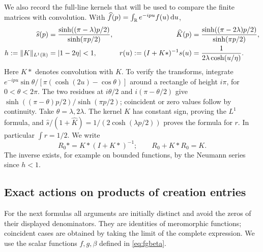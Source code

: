 We also record the full-line kernels that will be used to compare the
finite matrices with convolution.  With
$\widehat f(p)=\int_{\mathbb R}e^{-ipu}f(u)\,\mathrm d u$,
\begin{align}
 \widehat s(p)&=\frac{\sinh((\pi-\lambda)p/2)}{\sinh(\pi p/2)},&
 \widehat K(p)&=\frac{\sinh((\pi-2\lambda)p/2)}{\sinh(\pi p/2)},
 \label{eq:kernel-transforms}\\
 h:=\|K\|_{L^1(\mathbb R)}&=|1-2\eta|<1,&
 r(u):=(I+K*)^{-1}s(u)&=\frac1{2\lambda\cosh(u/\eta)}.
 \label{eq:dressed-density}
\end{align}
Here $K*$ denotes convolution with $K$.  To verify the transforms,
integrate $e^{-ipu}\sin\theta/[\pi(\cosh(2u)-\cos\theta)]$ around a
rectangle of height $i\pi$, for $0<\theta<2\pi$.  The two residues at
$i\theta/2$ and $i(\pi-\theta/2)$ give
$\sinh((\pi-\theta)p/2)/\sinh(\pi p/2)$; coincident or zero values
follow by continuity.  Take $\theta=\lambda,2\lambda$.
The kernel $K$ has constant sign, proving the $L^1$ formula, and
$\widehat s/(1+\widehat K)=1/(2\cosh(\lambda p/2))$ proves the
formula for $r$.  In particular $\int r=1/2$.
We write
\begin{equation}\label{eq:full-line-resolvent}
 R_0*=K*(I+K*)^{-1};
 \qquad R_0+K*R_0=K.
\end{equation}
The inverse exists, for example on bounded functions, by the Neumann
series since $h<1$.

\subsection{Exact actions on products of creation entries}

For the next formulas all arguments are initially distinct and avoid
the zeros of their displayed denominators.  They are identities of
meromorphic functions; coincident cases are obtained by taking the
limit of the complete expression.  We use the scalar functions
$f,g,\beta$ defined in \eqref{eq:fgbeta}.

